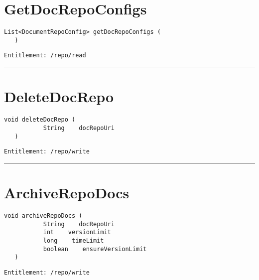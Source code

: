 \section{GetDocRepoConfigs}
\label{Api:GetDocRepoConfigs}
\begin{lstlisting}[style=nonumbers]
   List<DocumentRepoConfig> getDocRepoConfigs (
   )
\end{lstlisting}
\begin{Verbatim}[formatcom=\color{Maroon}]
  Entitlement: /repo/read
\end{Verbatim}



\rule{12cm}{2pt}
\section{DeleteDocRepo}
\label{Api:DeleteDocRepo}
\begin{lstlisting}[style=nonumbers]
   void deleteDocRepo (
           String    docRepoUri
   )
\end{lstlisting}
\begin{Verbatim}[formatcom=\color{Maroon}]
  Entitlement: /repo/write
\end{Verbatim}



\rule{12cm}{2pt}
\section{ArchiveRepoDocs}
\label{Api:ArchiveRepoDocs}
\begin{lstlisting}[style=nonumbers]
   void archiveRepoDocs (
           String    docRepoUri
           int    versionLimit
           long    timeLimit
           boolean    ensureVersionLimit
   )
\end{lstlisting}
\begin{Verbatim}[formatcom=\color{Maroon}]
  Entitlement: /repo/write
\end{Verbatim}



